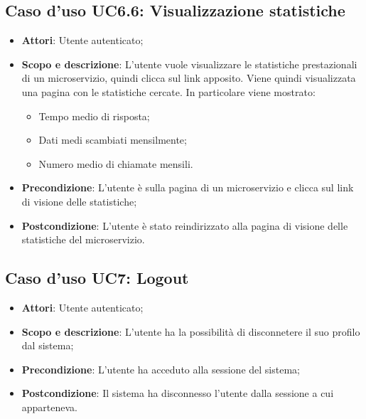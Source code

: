\documentclass[12pt,a4paper,titlepage]{article}
\begin{document}
	\subsection{Caso d'uso UC6.6: Visualizzazione statistiche }
	\label{UC6.6}
	\begin{itemize}
		\item \textbf{Attori}: Utente autenticato;
		\item \textbf{Scopo e descrizione}: L'utente vuole visualizzare le statistiche prestazionali di un microservizio, quindi clicca sul link apposito. Viene quindi visualizzata una pagina con le statistiche cercate. In particolare viene mostrato:
		\begin{itemize}
			\item Tempo medio di risposta;
			\item Dati medi scambiati mensilmente;
			\item Numero medio di chiamate mensili.
		\end{itemize}
		\item \textbf{Precondizione}: L'utente è sulla pagina di un microservizio e clicca sul link di visione delle statistiche;
		\item \textbf{Postcondizione}: L'utente è stato reindirizzato alla pagina di visione delle statistiche del microservizio.
	\end{itemize}
	\subsection{Caso d'uso UC7: Logout}
	\label{UC7}
	\begin{itemize}
		\item \textbf{Attori}: Utente autenticato;
		\item \textbf{Scopo e descrizione}: L'utente ha la possibilità di disconnetere il suo profilo dal sistema;
		\item \textbf{Precondizione}: L'utente ha acceduto alla sessione del sistema;
		\item \textbf{Postcondizione}: Il sistema ha disconnesso l'utente dalla sessione a cui apparteneva.
	\end{itemize}
\end{document}
